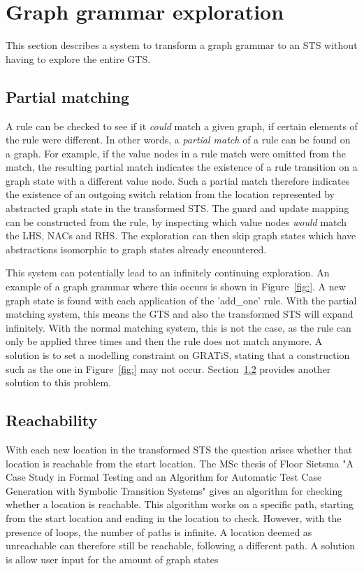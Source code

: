 \section{Graph grammar exploration}

This section describes a system to transform a graph grammar to an STS without having to explore the entire GTS.

\subsection{Partial matching}
A rule can be checked to see if it \textit{could} match a given graph, if certain elements of the rule were different. In other words, a \textit{partial match} of a rule  can be found on a graph. For example, if the value nodes in a rule match were omitted from the match, the resulting partial match indicates the existence of a rule transition on a graph state with a different value node. Such a partial match therefore indicates the existence of an outgoing switch relation from the location represented by abstracted graph state in the transformed STS. The guard and update mapping can be constructed from the rule, by inspecting which value nodes \textit{would} match the LHS, NACs and RHS. The exploration can then skip graph states which have abstractions isomorphic to graph states already encountered.

This system can potentially lead to an infinitely continuing exploration. An example of a graph grammar where this occurs is shown in Figure~\ref{fig:}. A new graph state is found with each application of the 'add_one' rule. With the partial matching system, this means the GTS and also the transformed STS will expand infinitely. With the normal matching system, this is not the case, as the rule can only be applied three times and then the rule does not match anymore. A solution is to set a modelling constraint on GRATiS, stating that a construction such as the one in Figure~\ref{fig:} may not occur. Section~\ref{sec:reachability} provides another solution to this problem. 

\subsection{Reachability}\label{sec:reachability}
With each new location in the transformed STS the question arises whether that location is reachable from the start location. The MSc thesis of Floor Sietsma "A Case Study in Formal Testing and an Algorithm for Automatic Test Case Generation with Symbolic Transition Systems" gives an algorithm for checking whether a location is reachable. This algorithm works on a specific path, starting from the start location and ending in the location to check. However, with the presence of loops, the number of paths is infinite. A location deemed as unreachable can therefore still be reachable, following a different path. A solution is allow user input for the amount of graph states
